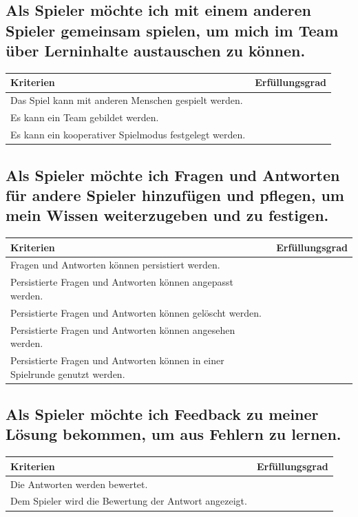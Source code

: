 \documentclass[a4paper,11pt,listof=numbered,glossary=totoc,parskip=half,toc=bib]{scrreprt}
\begin{document}
\begin{appendices}
		\subsection{Als Spieler möchte ich mit einem anderen Spieler gemeinsam spielen, um mich im Team über Lerninhalte austauschen zu können.}	
			\begin{tabularx}{\textwidth}{Xr}
			
			Kriterien & Erfüllungsgrad \\
			\midrule
		Das Spiel kann mit anderen Menschen gespielt werden. & \\
		Es kann ein Team gebildet werden. & \\
		Es kann ein kooperativer Spielmodus festgelegt werden. & \\
			\bottomrule
		\end{tabularx}	
		
		\subsection{Als Spieler möchte ich Fragen und Antworten für andere Spieler hinzufügen und pflegen, um mein
Wissen weiterzugeben und zu festigen.}
		\begin{tabularx}{\textwidth}{Xr}
			
			Kriterien & Erfüllungsgrad \\
			\midrule
		Fragen und Antworten können persistiert werden. & \\
		Persistierte Fragen und Antworten können angepasst werden. & \\
		Persistierte Fragen und Antworten können gelöscht werden. & \\
		Persistierte Fragen und Antworten können angesehen werden. & \\
		Persistierte Fragen und Antworten können in einer Spielrunde genutzt werden. & \\
			\bottomrule
		\end{tabularx}		
		
		\subsection{Als Spieler möchte ich Feedback zu meiner Lösung bekommen, um aus Fehlern zu lernen.}
		\begin{tabularx}{\textwidth}{Xr}
			
			Kriterien & Erfüllungsgrad \\
			\midrule
			Die Antworten werden bewertet. & \\
			Dem Spieler wird die Bewertung der Antwort angezeigt. & \\
			

\end{tabularx}
\end{appendices}
\end{document}
